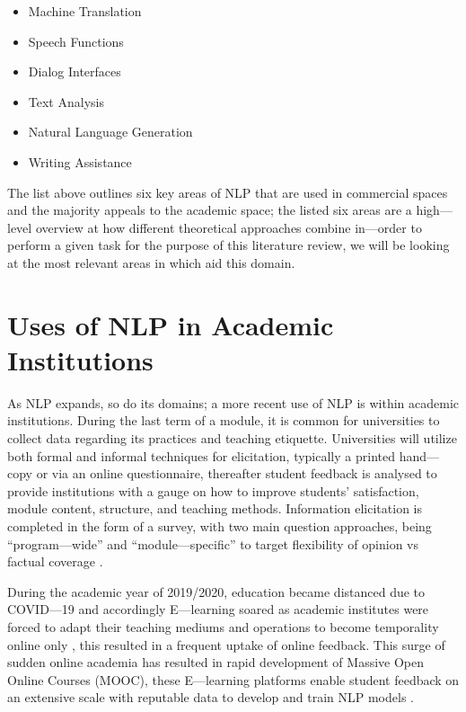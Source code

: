 \begin{itemize}
    \item Machine Translation
    \item Speech Functions
    \item Dialog Interfaces
    \item Text Analysis
    \item Natural Language Generation
    \item Writing Assistance
\end{itemize}

The list above outlines six key areas of NLP that are used in commercial spaces and the majority appeals to the academic space; the listed six areas are a high---level overview at how different theoretical approaches combine in---order to perform a given task \parencite{dale2019nlp} for the purpose of this literature review, we will be looking at the most relevant areas in which aid this domain.

\section{Uses of NLP in Academic Institutions}

As NLP expands, so do its domains; a more recent use of NLP is within academic institutions. During the last term of a module, it is common for universities to collect data regarding its practices and teaching etiquette. Universities will utilize both formal and informal techniques for elicitation, typically a printed hand---copy or via an online questionnaire, thereafter student feedback is analysed to provide institutions with a gauge on how to improve students’ satisfaction, module content, structure, and teaching methods. Information elicitation is completed in the form of a survey, with two main question approaches, being “program---wide” and “module---specific” to target flexibility of opinion vs factual coverage \parencite{keane2005obtaining, beran2007s}.

During the academic year of 2019/2020, education became distanced due to COVID---19 and accordingly E---learning soared as academic institutes were forced to adapt their teaching mediums and operations to become temporality online only \parencite{burgess2020schools}, this resulted in a frequent uptake of online feedback. This surge of sudden online academia has resulted in rapid development of Massive Open Online Courses (MOOC), these E---learning platforms enable student feedback on an extensive scale with reputable data to develop and train NLP models \parencite{wang2021predicting}.

